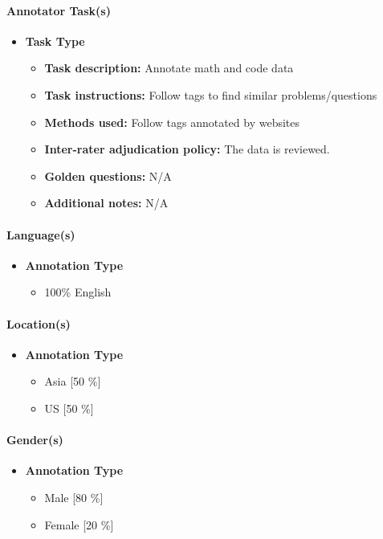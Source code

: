 \paragraph{Annotator Task(s)}
\begin{itemize}
    \item \textbf{Task Type}
    \begin{itemize}
        \item \textbf{Task description:} Annotate math and code data
        \item \textbf{Task instructions:} Follow tags to find similar problems/questions
        \item \textbf{Methods used:} Follow tags annotated by websites
        \item \textbf{Inter-rater adjudication policy:} The data is reviewed.
        \item \textbf{Golden questions:} N/A
        \item \textbf{Additional notes:} N/A
    \end{itemize}
\end{itemize}

\paragraph{Language(s)}
\begin{itemize}
    \item \textbf{Annotation Type}
    \begin{itemize}
        \item 100\% English
    \end{itemize}
\end{itemize}

\paragraph{Location(s)}
\begin{itemize}
    \item \textbf{Annotation Type}
    \begin{itemize}
        \item Asia [50 \%]
        \item US [50 \%]
    \end{itemize}
\end{itemize}

\paragraph{Gender(s)}
\begin{itemize}
    \item \textbf{Annotation Type}
    \begin{itemize}
        \item Male [80 \%]
        \item Female [20 \%]
    \end{itemize}
\end{itemize}

